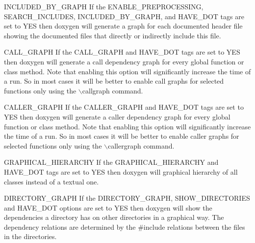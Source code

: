 \begin{DoxyDescription}
\label{config_cfg_included_by_graph}
\hypertarget{config_cfg_included_by_graph}{}
 
\item[{\ttfamily INCLUDED\_\-BY\_\-GRAPH} ] If the {\ttfamily ENABLE\_\-PREPROCESSING}, {\ttfamily SEARCH\_\-INCLUDES}, {\ttfamily INCLUDED\_\-BY\_\-GRAPH}, and {\ttfamily HAVE\_\-DOT} tags are set to {\ttfamily YES} then doxygen will generate a graph for each documented header file showing the documented files that directly or indirectly include this file.

\label{config_cfg_call_graph}
\hypertarget{config_cfg_call_graph}{}
 
\item[{\ttfamily CALL\_\-GRAPH} ] If the {\ttfamily CALL\_\-GRAPH} and {\ttfamily HAVE\_\-DOT} tags are set to {\ttfamily YES} then doxygen will generate a call dependency graph for every global function or class method. Note that enabling this option will significantly increase the time of a run. So in most cases it will be better to enable call graphs for selected functions only using the $\backslash$callgraph command.

\label{config_cfg_caller_graph}
\hypertarget{config_cfg_caller_graph}{}
 
\item[{\ttfamily CALLER\_\-GRAPH} ] If the {\ttfamily CALLER\_\-GRAPH} and {\ttfamily HAVE\_\-DOT} tags are set to {\ttfamily YES} then doxygen will generate a caller dependency graph for every global function or class method. Note that enabling this option will significantly increase the time of a run. So in most cases it will be better to enable caller graphs for selected functions only using the $\backslash$callergraph command.

\label{config_cfg_graphical_hierarchy}
\hypertarget{config_cfg_graphical_hierarchy}{}
 
\item[{\ttfamily GRAPHICAL\_\-HIERARCHY} ] If the {\ttfamily GRAPHICAL\_\-HIERARCHY} and {\ttfamily HAVE\_\-DOT} tags are set to {\ttfamily YES} then doxygen will graphical hierarchy of all classes instead of a textual one.

\label{config_cfg_directory_graph}
\hypertarget{config_cfg_directory_graph}{}
 
\item[{\ttfamily DIRECTORY\_\-GRAPH} ] If the {\ttfamily DIRECTORY\_\-GRAPH}, {\ttfamily SHOW\_\-DIRECTORIES} and {\ttfamily HAVE\_\-DOT} options are set to {\ttfamily YES} then doxygen will show the dependencies a directory has on other directories in a graphical way. The dependency relations are determined by the \#include relations between the files in the directories.


\end{DoxyDescription}
